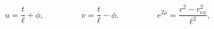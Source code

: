 \begin{equation}
u =\frac{t}{\ell}+\phi,\,\,\,\,\,\,\,\,\,\,\,\,\,\,\,\,\,\,\,\,\,\,\,\,\,\,\,v =\frac{t}{\ell}-\phi,\,\,\,\,\,\,\,\,\,\,\,\,\,\,\,
\,\,\,\,\,\,\,\,\,\,\,\,e^{2\rho
} =
\frac{r^{2}-r_{ex}
^{2}}{\ell^{2}},
\end{equation}

